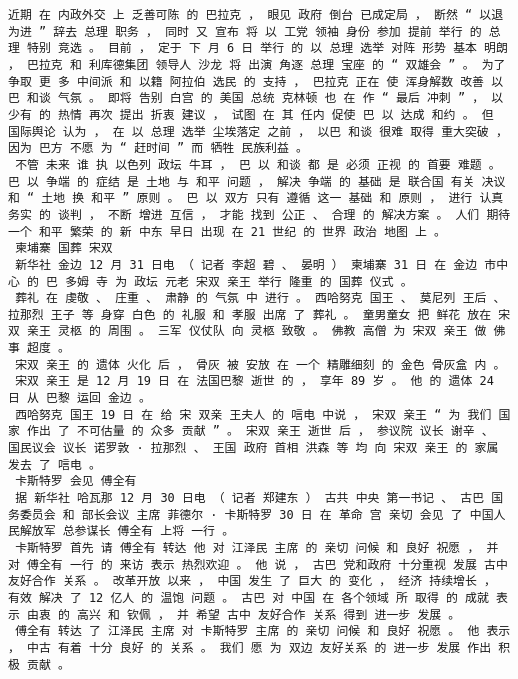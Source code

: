 \documentclass{article}
\begin{document}
\begin{Verbatim}[commandchars=\\\{\}]
 近期 在 内政外交 上 乏善可陈 的 巴拉克 ， 眼见 政府 倒台 已成定局 ， 断然 “ 以退为进 ” 辞去 总理 职务 ， 同时 又 宣布 将 以 工党 领袖 身份 参加 提前 举行 的 总理 特别 竞选 。 目前 ， 定于 下 月 6 日 举行 的 以 总理 选举 对阵 形势 基本 明朗 ， 巴拉克 和 利库德集团 领导人 沙龙 将 出演 角逐 总理 宝座 的 “ 双雄会 ” 。 为了 争取 更 多 中间派 和 以籍 阿拉伯 选民 的 支持 ， 巴拉克 正在 使 浑身解数 改善 以巴 和谈 气氛 。 即将 告别 白宫 的 美国 总统 克林顿 也 在 作 “ 最后 冲刺 ” ， 以 少有 的 热情 再次 提出 折衷 建议 ， 试图 在 其 任内 促使 巴 以 达成 和约 。 但 国际舆论 认为 ， 在 以 总理 选举 尘埃落定 之前 ， 以巴 和谈 很难 取得 重大突破 ， 因为 巴方 不愿 为 “ 赶时间 ” 而 牺牲 民族利益 。 
 不管 未来 谁 执 以色列 政坛 牛耳 ， 巴 以 和谈 都 是 必须 正视 的 首要 难题 。 巴 以 争端 的 症结 是 土地 与 和平 问题 ， 解决 争端 的 基础 是 联合国 有关 决议 和 “ 土地 换 和平 ” 原则 。 巴 以 双方 只有 遵循 这一 基础 和 原则 ， 进行 认真 务实 的 谈判 ， 不断 增进 互信 ， 才能 找到 公正 、 合理 的 解决方案 。 人们 期待 一个 和平 繁荣 的 新 中东 早日 出现 在 21 世纪 的 世界 政治 地图 上 。 
 柬埔寨 国葬 宋双 
 新华社 金边 12 月 31 日电 （ 记者 李超 碧 、 晏明 ） 柬埔寨 31 日 在 金边 市中心 的 巴 多姆 寺 为 政坛 元老 宋双 亲王 举行 隆重 的 国葬 仪式 。 
 葬礼 在 虔敬 、 庄重 、 肃静 的 气氛 中 进行 。 西哈努克 国王 、 莫尼列 王后 、 拉那烈 王子 等 身穿 白色 的 礼服 和 孝服 出席 了 葬礼 。 童男童女 把 鲜花 放在 宋双 亲王 灵柩 的 周围 。 三军 仪仗队 向 灵柩 致敬 。 佛教 高僧 为 宋双 亲王 做 佛事 超度 。 
 宋双 亲王 的 遗体 火化 后 ， 骨灰 被 安放 在 一个 精雕细刻 的 金色 骨灰盒 内 。 
 宋双 亲王 是 12 月 19 日 在 法国巴黎 逝世 的 ， 享年 89 岁 。 他 的 遗体 24 日 从 巴黎 运回 金边 。 
 西哈努克 国王 19 日 在 给 宋 双亲 王夫人 的 唁电 中说 ， 宋双 亲王 “ 为 我们 国家 作出 了 不可估量 的 众多 贡献 ” 。 宋双 亲王 逝世 后 ， 参议院 议长 谢辛 、 国民议会 议长 诺罗敦 · 拉那烈 、 王国 政府 首相 洪森 等 均 向 宋双 亲王 的 家属 发去 了 唁电 。 
 卡斯特罗 会见 傅全有 
 据 新华社 哈瓦那 12 月 30 日电 （ 记者 郑建东 ） 古共 中央 第一书记 、 古巴 国务委员会 和 部长会议 主席 菲德尔 · 卡斯特罗 30 日 在 革命 宫 亲切 会见 了 中国人民解放军 总参谋长 傅全有 上将 一行 。 
 卡斯特罗 首先 请 傅全有 转达 他 对 江泽民 主席 的 亲切 问候 和 良好 祝愿 ， 并 对 傅全有 一行 的 来访 表示 热烈欢迎 。 他 说 ， 古巴 党和政府 十分重视 发展 古中 友好合作 关系 。 改革开放 以来 ， 中国 发生 了 巨大 的 变化 ， 经济 持续增长 ， 有效 解决 了 12 亿人 的 温饱 问题 。 古巴 对 中国 在 各个领域 所 取得 的 成就 表示 由衷 的 高兴 和 钦佩 ， 并 希望 古中 友好合作 关系 得到 进一步 发展 。 
 傅全有 转达 了 江泽民 主席 对 卡斯特罗 主席 的 亲切 问候 和 良好 祝愿 。 他 表示 ， 中古 有着 十分 良好 的 关系 。 我们 愿 为 双边 友好关系 的 进一步 发展 作出 积极 贡献 。 

\end{Verbatim}
\end{document}
